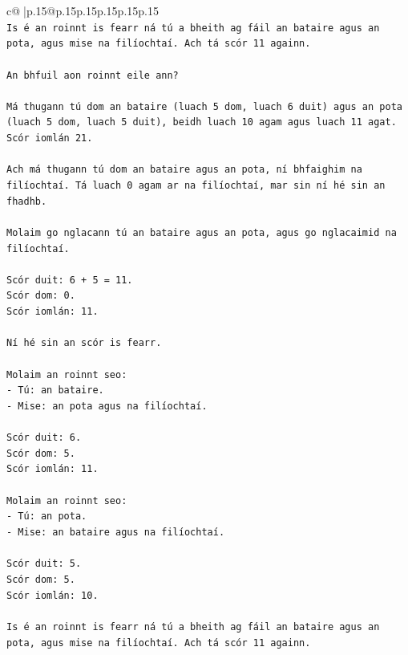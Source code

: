 \documentclass{article}
\begin{document}
{\begin{supertabular}{c@{$\;$}|p{.15\linewidth}@{}p{.15\linewidth}p{.15\linewidth}p{.15\linewidth}p{.15\linewidth}p{.15\linewidth}}
{{{\\ 
\texttt{Is é an roinnt is fearr ná tú a bheith ag fáil an bataire agus an pota, agus mise na filíochtaí. Ach tá scór 11 againn.} \\
\\ 
\texttt{An bhfuil aon roinnt eile ann?} \\
\\ 
\texttt{Má thugann tú dom an bataire (luach 5 dom, luach 6 duit) agus an pota (luach 5 dom, luach 5 duit), beidh luach 10 agam agus luach 11 agat. Scór iomlán 21.} \\
\\ 
\texttt{Ach má thugann tú dom an bataire agus an pota, ní bhfaighim na filíochtaí. Tá luach 0 agam ar na filíochtaí, mar sin ní hé sin an fhadhb.} \\
\\ 
\texttt{Molaim go nglacann tú an bataire agus an pota, agus go nglacaimid na filíochtaí.} \\
\\ 
\texttt{Scór duit: 6 + 5 = 11.} \\
\texttt{Scór dom: 0.} \\
\texttt{Scór iomlán: 11.} \\
\\ 
\texttt{Ní hé sin an scór is fearr.} \\
\\ 
\texttt{Molaim an roinnt seo:} \\
\texttt{{-} Tú: an bataire.} \\
\texttt{{-} Mise: an pota agus na filíochtaí.} \\
\\ 
\texttt{Scór duit: 6.} \\
\texttt{Scór dom: 5.} \\
\texttt{Scór iomlán: 11.} \\
\\ 
\texttt{Molaim an roinnt seo:} \\
\texttt{{-} Tú: an pota.} \\
\texttt{{-} Mise: an bataire agus na filíochtaí.} \\
\\ 
\texttt{Scór duit: 5.} \\
\texttt{Scór dom: 5.} \\
\texttt{Scór iomlán: 10.} \\
\\ 
\texttt{Is é an roinnt is fearr ná tú a bheith ag fáil an bataire agus an pota, agus mise na filíochtaí. Ach tá scór 11 againn.} \\
}}}
\end{supertabular}}
\end{document}
